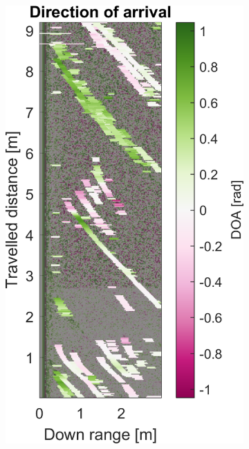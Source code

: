 \begin{figure}[htbp]
\begin{subfigure}[t]{0.475\linewidth}
        \includegraphics[width=\linewidth,max height=.475\textheight]{gfx/results/mancave_doa.png}
    \end{subfigure}%
    \hfill%
    \begin{subfigure}[t]{0.475\linewidth}
        \centering

\end{subfigure}
\end{figure}
